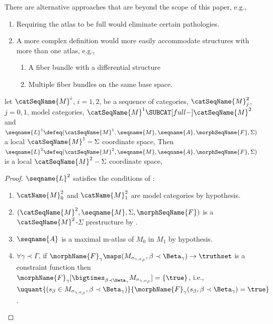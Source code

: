 \documentclass{article}
\begin{document}
\begin{remark}
There are alternative approaches that are beyond the scope of this
paper, e.g.,
\begin{enumerate}
\item Requiring the atlas to be full would eliminate certain pathologies.
\item A more complex definition would more easily accommodate structures
with more than one atlas, e.g.,
\begin{enumerate}
\item A fiber bundle with a differential structure
\item Multiple fiber bundles on the same base space.
\end{enumerate}
\end{enumerate}
\end{remark}

\begin{lemma}
\label{lem:LCS}
let $\catSeqName{M}^i$, $i=1,2$, be a sequence of categories,
$\catSeqName{M}^2_j$, $j=0,1$, model categories,
$\catSeqName{M}^1 \SUBCAT[full-] \catSeqName{M}^2$ and
\nobreaks
    {{
     $
        \seqname{L}^1 \defeq
        (\catSeqName{M}^1, \seqname{M}, \seqname{A}, \morphSeqName{F}, \Sigma)
    $
  }}
a local $\catSeqName{M}^1-\Sigma$ coordinate space, Then
$
  \seqname{L}^2 \defeq
  (\catSeqName{M}^2, \seqname{M}, \seqname{A}, \morphSeqName{F}, \Sigma)
$
is a local $\catSeqName{M}^2-\Sigma$ coordinate space,

\begin{proof}
$\seqname{L}^2$ satisfies the conditions of :
\begin{enumerate}
\item $\catName{M}^2_0$ and $\catName{M}^2_1$ are model categories by
hypothesis.
\item $(\catSeqName{M}^2, \seqname{M}, \Sigma, \morphSeqName{F})$ is a
$\catSeqName{M}^2$-$\Sigma$ prestructure by
.
\item $\seqname{A}$ is a maximal m-atlas of $M_0$ in $M_1$ by hypothesis.
\item $\forall \gamma \prec \Gamma$, if
$\morphName{F}_\gamma \maps (M_{\sigma_{\gamma,\alpha_\beta}}, \beta
\prec \Beta_\gamma) \to \truthset$ is a constraint function then \\
$
  \morphName{F}_\gamma
    [
      \bigtimes_{\beta \prec \Beta_\gamma}
      M_{\sigma_{\gamma,\alpha_\beta}}
    ]
  = \{ \true \}
$,
i.e., \\
$
  \uquant
  {
    {
      (
        s_\beta \in M_{\sigma_{\gamma,\alpha_\beta}},
        \beta \prec \Beta_\gamma
      )
    }
  }
  {{\morphName{F}_\gamma(s_\beta, \beta \prec \Beta_\gamma) = \true}}
$.
\end{enumerate}
\end{proof}
\end{lemma}
\end{document}
